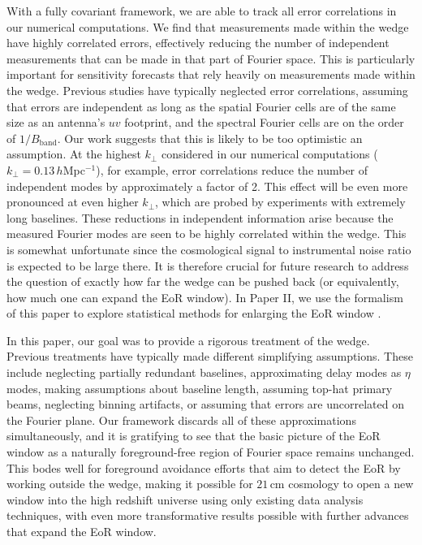 \documentclass[twocolumn,aps,prd,nofootinbib,showpacs]{revtex4-1}
\begin{document}
With a fully covariant framework, we are able to track all error correlations in our numerical computations.  We find that measurements made within the wedge have highly correlated errors, effectively reducing the number of independent measurements that can be made in that part of Fourier space.  This is particularly important for sensitivity forecasts that rely heavily on measurements made within the wedge.  Previous studies have typically neglected error correlations, assuming that errors are independent as long as the spatial Fourier cells are of the same size as an antenna's $uv$ footprint, and the spectral Fourier cells are on the order of $1/ B_\textrm{band}$.  Our work suggests that this is likely to be too optimistic an assumption.  At the highest $k_\perp$ considered in our numerical computations ($k_\perp = 0.13\,h$Mpc$^{-1}$), for example, error correlations reduce the number of independent modes by approximately a factor of 2.  This effect will be even more pronounced at even higher $k_\perp$, which are probed by experiments with extremely long baselines.  These reductions in independent information arise because the measured Fourier modes are seen to be highly correlated within the wedge.   This is somewhat unfortunate since the cosmological signal to instrumental noise ratio is expected to be large there.  It is therefore crucial for future research to address the question of exactly how far the wedge can be pushed back (or equivalently, how much one can expand the EoR window).  In Paper II, we use the formalism of this paper to explore statistical methods for enlarging the EoR window \cite{Liu2014b}.

In this paper, our goal was to provide a rigorous treatment of the wedge.  Previous treatments have typically made different simplifying assumptions.  These include neglecting partially redundant baselines, approximating delay modes as $\eta$ modes, making assumptions about baseline length, assuming top-hat primary beams, neglecting binning artifacts, or assuming that errors are uncorrelated on the Fourier plane.  Our framework discards all of these approximations simultaneously, and it is gratifying to see that the basic picture of the EoR window as a naturally foreground-free region of Fourier space remains unchanged.  This bodes well for foreground avoidance efforts that aim to detect the EoR by working outside the wedge, making it possible for $21\,\textrm{cm}$ cosmology to open a new window into the high redshift universe using only existing data analysis techniques, with even more transformative results possible with further advances that expand the EoR window.
\end{document}
